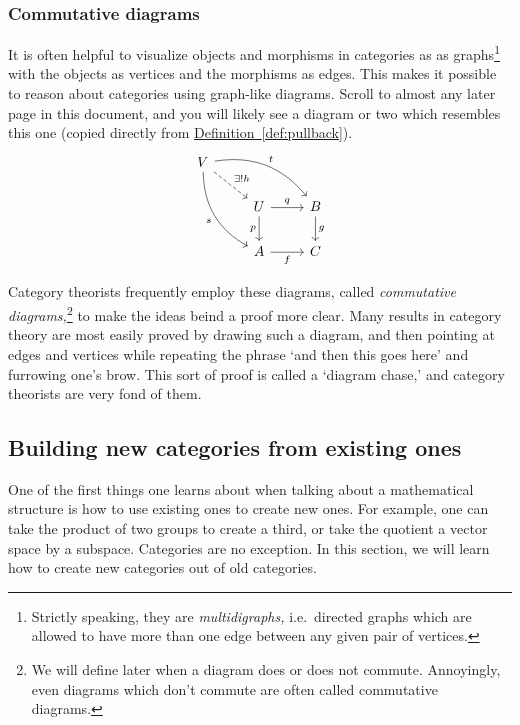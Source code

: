 \documentclass[main.tex]{subfiles}
\begin{document}
\subsubsection{Commutative diagrams}\label{sss:commutative_diagrams}

It is often helpful to visualize objects and morphisms in categories as as graphs\footnote{Strictly speaking, they are \emph{multidigraphs,} i.e.\ directed graphs which are allowed to have more than one edge between any given pair of vertices.} with the objects as vertices and the morphisms as edges. This makes it possible to reason about categories using graph-like diagrams. Scroll to almost any later page in this document, and you will likely see a diagram or two which resembles this one (copied directly from \hyperref[def:pullback]{Definition~\ref*{def:pullback}}).
\begin{equation*}
  \begin{tikzcd}
    V
    \arrow[rrd, bend left, "t"]
    \arrow[rd, dashed, "\exists!h"]
    \arrow[rdd, bend right, swap, "s"]
    \\
    & U
    \arrow[r, "q"]
    \arrow[d, swap, "p"]
    & B
    \arrow[d, "g"]
    \\
    & A
    \arrow[r, swap, "f"]
    & C
  \end{tikzcd}
\end{equation*}

Category theorists frequently employ these diagrams, called \emph{commutative diagrams,}\footnote{We will define later when a diagram does or does not commute. Annoyingly, even diagrams which don't commute are often called commutative diagrams.} to make the ideas beind a proof more clear. Many results in category theory are most easily proved by drawing such a diagram, and then pointing at edges and vertices while repeating the phrase `and then this goes here' and furrowing one's brow. This sort of proof is called a `diagram chase,' and category theorists are very fond of them.


\subsection{Building new categories from existing ones}

One of the first things one learns about when talking about a mathematical structure is how to use existing ones to create new ones. For example, one can take the product of two groups to create a third, or take the quotient a vector space by a subspace. Categories are no exception. In this section, we will learn how to create new categories out of old categories.
\end{document}
